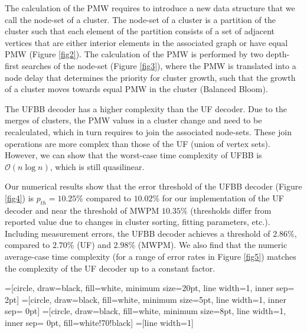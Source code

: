 \documentclass[11pt, a4paper, twoside, titlepage ,dvipsnames]{report}
\begin{document}
The calculation of the PMW requires to introduce a new data structure that we call the node-set of a cluster. The node-set of a cluster is a partition of the cluster such that each element of the partition consists of a set of adjacent vertices that are either interior elements in the associated graph or have equal PMW (Figure \ref{fig2}). The calculation of the PMW is performed by two depth-first searches of the node-set (Figure \ref{fig3}), where the PMW is translated into a node delay that determines the priority for cluster growth, such that the growth of a cluster moves towards equal PMW in the cluster (Balanced Bloom).

The UFBB decoder has a higher complexity than the UF decoder. Due to the merges of clusters, the PMW values in a cluster change and need to be recalculated, which in turn requires to join the associated node-sets. These join operations are more complex than those of the UF (union of vertex sets). However, we can show that the worst-case time complexity of UFBB is $\mathcal{O}(n \log n)$, which is still quasilinear.

Our numerical results show that the error threshold of the UFBB decoder (Figure \ref{fig4}) is $p_{th} = 10.25\%$ compared to $10.02\%$ for our implementation of the UF decoder and near the threshold of MWPM $10.35\%$ (thresholds differ from reported value due to changes in cluster sorting, fitting parameters, etc.). Including measurement errors, the UFBB decoder achieves a threshold of $2.86\%$, compared to $2.70\%$ (UF) and $2.98\%$ (MWPM). We also find that the numeric average-case time complexity (for a range of error rates in Figure \ref{fig5}) matches the complexity of the UF decoder up to a constant factor.

\vspace{1em}
\printbibliography[heading=none]

=[circle, draw=black, fill=white, minimum size=20pt, line width=1, inner sep= 2pt]
=[circle, draw=black, fill=white, minimum size=5pt, line width=1, inner sep= 0pt]
=[circle, draw=black, fill=white, minimum size=8pt, line width=1, inner sep= 0pt, fill=white!70!black]
=[line width=1]
\tikzfading[name=fade right, left color=transparent!0, right color=transparent!100]
\end{document}
